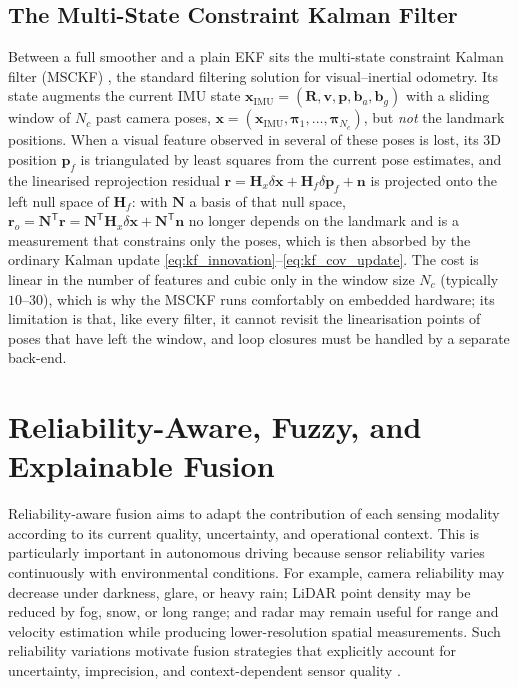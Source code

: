 \subsection{The Multi-State Constraint Kalman Filter}
\label{subsec:msckf}
Between a full smoother and a plain EKF sits the multi-state constraint Kalman filter (MSCKF) \cite{mourikis_multistate_2007}, the standard filtering solution for visual--inertial odometry. Its state augments the current IMU state $\mathbf{x}_{\mathrm{IMU}}=(\mathbf{R},\mathbf{v},\mathbf{p},\mathbf{b}_a,\mathbf{b}_g)$ with a sliding window of $N_c$ past camera poses, $\mathbf{x}=(\mathbf{x}_{\mathrm{IMU}},\boldsymbol{\pi}_1,\ldots,\boldsymbol{\pi}_{N_c})$, but \emph{not} the landmark positions. When a visual feature observed in several of these poses is lost, its 3D position $\mathbf{p}_f$ is triangulated by least squares from the current pose estimates, and the linearised reprojection residual $\mathbf{r}=\mathbf{H}_x\delta\mathbf{x}+\mathbf{H}_f\delta\mathbf{p}_f+\mathbf{n}$ is projected onto the left null space of $\mathbf{H}_f$: with $\mathbf{N}$ a basis of that null space, $\mathbf{r}_o=\mathbf{N}^{\mathsf T}\mathbf{r}=\mathbf{N}^{\mathsf T}\mathbf{H}_x\delta\mathbf{x}+\mathbf{N}^{\mathsf T}\mathbf{n}$ no longer depends on the landmark and is a measurement that constrains only the poses, which is then absorbed by the ordinary Kalman update \eqref{eq:kf_innovation}--\eqref{eq:kf_cov_update}. The cost is linear in the number of features and cubic only in the window size $N_c$ (typically $10$--$30$), which is why the MSCKF runs comfortably on embedded hardware; its limitation is that, like every filter, it cannot revisit the linearisation points of poses that have left the window, and loop closures must be handled by a separate back-end.

\section{Reliability-Aware, Fuzzy, and Explainable Fusion}



Reliability-aware fusion aims to adapt the contribution of each sensing modality according to its current quality, uncertainty, and operational context. This is particularly important in autonomous driving because sensor reliability varies continuously with environmental conditions. For example, camera reliability may decrease under darkness, glare, or heavy rain; LiDAR point density may be reduced by fog, snow, or long range; and radar may remain useful for range and velocity estimation while producing lower-resolution spatial measurements. Such reliability variations motivate fusion strategies that explicitly account for uncertainty, imprecision, and context-dependent sensor quality \cite{khaleghi_multisensor_2013, hall_introduction_1997}.

